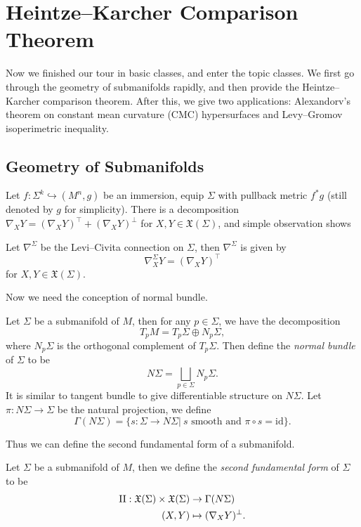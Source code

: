 \chapter{Heintze--Karcher Comparison Theorem}

Now we finished our tour in basic classes, and enter the topic classes.
We first go through the geometry of submanifolds rapidly, and then provide the Heintze--Karcher comparison theorem.
After this, we give two applications:
Alexandorv's theorem on constant mean curvature (CMC) hypersurfaces and Levy--Gromov isoperimetric inequality.

\section{Geometry of Submanifolds}

Let $f:\Sigma^k\hookrightarrow(M^n,g)$ be an immersion, equip $\Sigma$ with pullback metric $f^*g$ (still denoted by $g$ for simplicity).
There is a decomposition $\nabla_XY=(\nabla_XY)^\top+(\nabla_XY)^\perp$ for $X,Y\in\mathfrak{X}(\Sigma)$, and simple observation shows
\begin{prop}
    Let $\nabla^\Sigma$ be the Levi--Civita connection on $\Sigma$, then $\nabla^\Sigma$ is given by
    \[\nabla^\Sigma_XY=(\nabla_XY)^\top\]
    for $X,Y\in\mathfrak{X}(\Sigma)$.
\end{prop}

Now we need the conception of normal bundle.
\begin{defn}
    Let $\Sigma$ be a submanifold of $M$, then for any $p\in\Sigma$, we have the decomposition
    \[T_pM=T_p\Sigma\oplus N_p\Sigma,\]
    where $N_p\Sigma$ is the orthogonal complement of $T_p\Sigma$.
    Then define the \emph{normal bundle} of $\Sigma$ to be
    \[N\Sigma=\bigsqcup_{p\in\Sigma}N_p\Sigma.\]
    It is similar to tangent bundle to give differentiable structure on $N\Sigma$.
    Let $\pi:N\Sigma\to\Sigma$ be the natural projection, we define
    \[\Gamma(N\Sigma)=\{s:\Sigma\to N\Sigma|\ s\text{ smooth and }\pi\circ s=\mathrm{id}\}.\]
\end{defn}

Thus we can define the second fundamental form of a submanifold.
\begin{defn}
    Let $\Sigma$ be a submanifold of $M$, then we define the \emph{second fundamental form} of $\Sigma$ to be
    \begin{align*}
        \operatorname{II}:\mathfrak{X}(\Sigma)\times\mathfrak{X}(\Sigma)&\to\Gamma(N\Sigma)\\
        (X,Y)&\mapsto(\nabla_XY)^\perp.
    \end{align*}
\end{defn}

